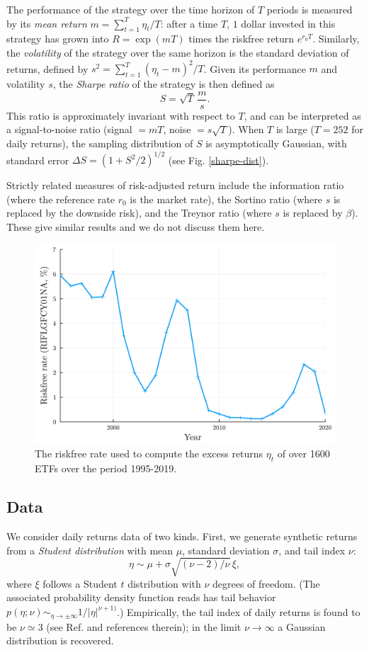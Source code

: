 \documentclass[
reprint,
amsmath,amssymb,
aps,
]{revtex4-2}
\begin{document}
The performance of the strategy over the time horizon of $T$ periods is measured by its \emph{mean return} $m = \sum_{t=1}^T \eta_{t}/T$: after a time $T$, $1$ dollar invested in this strategy has grown into $R = \exp(mT)$ times the riskfree return $e^{r_0T}$. 
Similarly, the \emph{volatility} of the strategy over the same horizon is the standard deviation of returns, defined by $s^2 = \sum_{t=1}^T (\eta_{t} - m)^2/T$.
Given its performance $m$ and volatility $s$, the \emph{Sharpe ratio} of the strategy is then defined as 
\begin{equation}
    S = \sqrt{T}\, \frac{m}{s}.    
\end{equation}
This ratio is approximately invariant with respect to $T$, and can be interpreted as a signal-to-noise ratio (signal $=mT$, noise $=s\sqrt{T}$). When $T$ is large ($T = 252$ for daily returns), the sampling distribution of $S$ is asymptotically Gaussian, with standard error $\Delta S = (1+S^2/2)^{1/2}$ \cite{loStatistics2002} (see Fig. \ref{sharpe-dist}).

Strictly related measures of risk-adjusted return include the information ratio (where the reference rate $r_0$ is the market rate), the Sortino ratio (where $s$ is replaced by the downside risk), and the Treynor ratio (where $s$ is replaced by $\beta$). These give similar results and we do not discuss them here.  


\begin{figure}[t!]
    \includegraphics[width = .45\textwidth]{riskfree-rate.png}
    \caption{The riskfree rate used to compute the excess returns $\eta_t$ of over 1600 ETFs over the period 1995-2019.}
    \label{riskfree-rate}
\end{figure}

\subsection{Data}

We consider daily returns data of two kinds. First, we generate synthetic returns from a \emph{Student distribution} with mean $\mu$, standard deviation $\sigma$, and tail index $\nu$:
\begin{equation}
    \eta \sim \mu + \sigma\sqrt{(\nu - 2)/\nu}\, \xi,
\end{equation}
where $\xi$ follows a Student $t$ distribution with $\nu$ degrees of freedom. (The associated probability density function reads has tail behavior $p(\eta; \nu)\sim_{\eta\to\pm\infty} 1/\vert\eta\vert^{\nu + 1)}$.) 
Empirically, the tail index of daily returns is found to be $\nu\simeq 3$ (see Ref. \cite{bouchaudTheory2003} and references therein); in the limit $\nu\to\infty$ a Gaussian distribution is recovered. 
\end{document}
